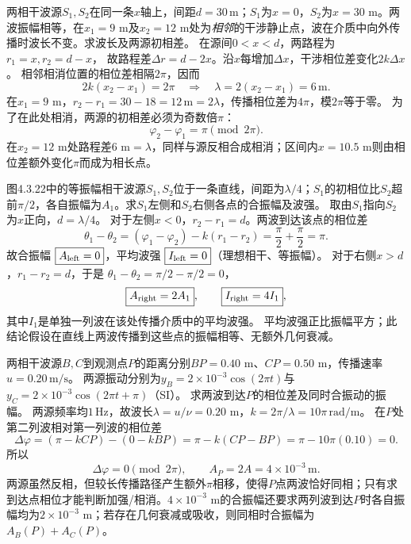 \problemtext 两相干波源$S_1,S_2$在同一条$x$轴上，间距$d=30\,\mathrm m$；$S_1$为$x=0$，$S_2$为$x=30$ m。两波振幅相等，在$x_1=9$ m及$x_2=12$ m处为\emph{相邻}的干涉静止点，波在介质中向外传播时波长不变。求波长及两源初相差。
\workings
在源间$0<x<d$，两路程为$r_1=x,r_2=d-x$，
故路程差$\Delta r=d-2x$。沿$x$每增加$\Delta x$，干涉相位差变化$2k\Delta x$。
相邻相消位置的相位差相隔$2\pi$，因而
\[
2k(x_2-x_1)=2\pi
\quad\Longrightarrow\quad
\boxed{\lambda=2(x_2-x_1)=6\,\mathrm m}.
\]
在$x_1=9$ m，$r_2-r_1=30-18=12\,\mathrm m=2\lambda$，传播相位差为$4\pi$，模$2\pi$等于零。
为了在此处相消，两源的初相差必须为奇数倍$\pi$：
\[
\boxed{\varphi_2-\varphi_1=\pi\pmod{2\pi}}.
\]
\crosscheck 在$x_2=12$ m处路程差$6$ m$=\lambda$，同样与源反相合成相消；区间内$x=10.5$ m则由相位差额外变化$\pi$而成为相长点。

\problemtext 图4.3.22中的等振幅相干波源$S_1,S_2$位于一条直线，间距为$\lambda/4$；$S_1$的初相位比$S_2$超前$\pi/2$，各自振幅为$A_1$。求$S_1$左侧和$S_2$右侧各点的合振幅及波强。
\workings
取由$S_1$指向$S_2$为$x$正向，$d=\lambda/4$。
对于左侧$x<0$，$r_2-r_1=d$。两波到达该点的相位差
\[
\theta_1-\theta_2
=(\varphi_1-\varphi_2)-k(r_1-r_2)
=\frac\pi2+\frac\pi2=\pi.
\]
故合振幅
$\boxed{A_{\rm left}=0}$，平均波强
$\boxed{I_{\rm left}=0}$（理想相干、等振幅）。
对于右侧$x>d$，$r_1-r_2=d$，于是
$\theta_1-\theta_2=\pi/2-\pi/2=0$，
\[
\boxed{A_{\rm right}=2A_1},\qquad
\boxed{I_{\rm right}=4I_1},
\]
其中$I_1$是单独一列波在该处传播介质中的平均波强。
\crosscheck 平均波强正比振幅平方；此结论假设在直线上两波传播到这些点的振幅相等、无额外几何衰减。

\problemtext 两相干波源$B,C$到观测点$P$的距离分别$BP=0.40$ m、$CP=0.50$ m，传播速率$u=0.20\,\mathrm{m/s}$。
两源振动分别为$y_B=2\times10^{-3}\cos(2\pi t)$与
$y_C=2\times10^{-3}\cos(2\pi t+\pi)$（SI）。
求两波到达$P$的相位差及同时合振动的振幅。
\workings
两源频率均$1\,\mathrm{Hz}$，故波长$\lambda=u/\nu=0.20$ m，$k=2\pi/\lambda=10\pi\,\mathrm{rad/m}$。
在$P$处第二列波相对第一列波的相位差
\[
\Delta\varphi=(\pi-k CP)-(0-k BP)
=\pi-k(CP-BP)
=\pi-10\pi(0.10)=0.
\]
所以
\[
\boxed{\Delta\varphi=0\pmod{2\pi}},\qquad
\boxed{A_P=2A=4\times10^{-3}\,\mathrm m}.
\]
\crosscheck 两源虽然反相，但较长传播路径产生额外$\pi$相移，使得$P$点两波恰好同相；只有求到达点相位才能判断加强/相消。$4\times10^{-3}$ m的合振幅还要求两列波到达$P$时各自振幅均为$2\times10^{-3}$ m；若存在几何衰减或吸收，则同相时合振幅为$A_B(P)+A_C(P)$。
